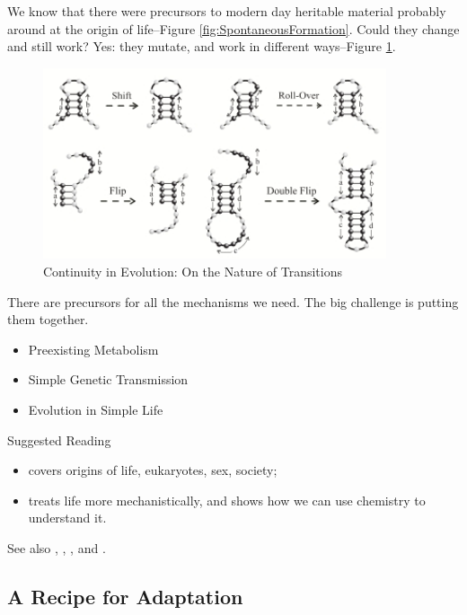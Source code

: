 \documentclass[]{article}
\begin{document}
We know that there were precursors to modern day heritable material probably around at the origin of life--Figure \ref{fig:SpontaneousFormation}\cite{cafferty2016spontaneous}. Could they change and still work? Yes: they mutate, and work in different ways--Figure \ref{fig:ContinuityInEvolution}\cite{fontana1998continuity}.

\begin{figure}[H]
	\caption{Continuity in Evolution: On the Nature of Transitions}\label{fig:ContinuityInEvolution}
	\includegraphics[width=0.9\textwidth]{ContinuityInEvolution}
\end{figure}
There are precursors for all the mechanisms we need. The big challenge is putting them together.
\begin{itemize}
	\item Preexisting Metabolism
	\item Simple Genetic Transmission
	\item Evolution in Simple Life
\end{itemize}

Suggested Reading
\begin{itemize}
	\item \cite{maynard1999origins} covers origins of life, eukaryotes, sex, society; 
	\item \cite{sumper1975evidence} treats life more mechanistically, and shows how we can use chemistry to understand it.
\end{itemize}

See also \cite{orgel2004prebiotic}, \cite{eigen1971selforganization}, \cite{kun2005real}, and \cite{ratcliff2014experimental}.

\subsection{A Recipe for Adaptation}
\end{document}

